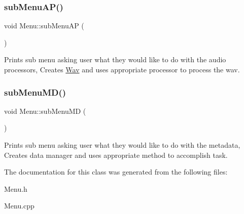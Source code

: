 \subsubsection{\texorpdfstring{sub\+Menu\+A\+P()}{subMenuAP()}}
{\footnotesize\ttfamily void Menu\+::sub\+Menu\+AP (\begin{DoxyParamCaption}{ }\end{DoxyParamCaption})}

Prints sub menu asking user what they would like to do with the audio processors, Creates \hyperlink{classWav}{Wav} and uses appropriate processor to process the wav. \mbox{\label{classMenu_a28a9e396689f13b8f3f2bc4e30d4caea}} 
\subsubsection{\texorpdfstring{sub\+Menu\+M\+D()}{subMenuMD()}}
{\footnotesize\ttfamily void Menu\+::sub\+Menu\+MD (\begin{DoxyParamCaption}{ }\end{DoxyParamCaption})}

Prints sub menu asking user what they would like to do with the metadata, Creates data manager and uses appropriate method to accomplish task. 

The documentation for this class was generated from the following files\+:\begin{DoxyCompactItemize}
\item 
Menu.\+h\item 
Menu.\+cpp\end{DoxyCompactItemize}
